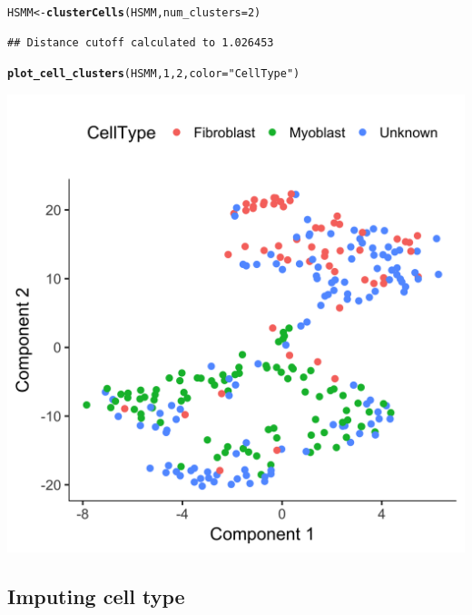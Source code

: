 \documentclass[10pt,oneside]{article}\usepackage[]{graphicx}\usepackage[]{color}
\makeatletter
\def\maxwidth{ %
  \ifdim\Gin@nat@width>\linewidth
    \linewidth
  \else
    \Gin@nat@width
  \fi
}
\newcommand{\hlnum}[1]{\textcolor[rgb]{0.686,0.059,0.569}{#1}}%
\newcommand{\hlstr}[1]{\textcolor[rgb]{0.192,0.494,0.8}{#1}}%
\newcommand{\hlstd}[1]{\textcolor[rgb]{0.345,0.345,0.345}{#1}}%
\newcommand{\hlkwb}[1]{\textcolor[rgb]{0.69,0.353,0.396}{#1}}%
\newcommand{\hlkwc}[1]{\textcolor[rgb]{0.333,0.667,0.333}{#1}}%
\newcommand{\hlkwd}[1]{\textcolor[rgb]{0.737,0.353,0.396}{\textbf{#1}}}%
\newenvironment{kframe}{%
 \def\at@end@of@kframe{}%
 \ifinner\ifhmode%
  \def\at@end@of@kframe{\end{minipage}}%
  \begin{minipage}{\columnwidth}%
 \fi\fi%
 \def\FrameCommand##1{\hskip\@totalleftmargin \hskip-\fboxsep
 \colorbox{shadecolor}{##1}\hskip-\fboxsep
     \hskip-\linewidth \hskip-\@totalleftmargin \hskip\columnwidth}%
 \MakeFramed {\advance\hsize-\width
   \@totalleftmargin\z@ \linewidth\hsize
   \@setminipage}}%
 {\par\unskip\endMakeFramed%
 \at@end@of@kframe}
\newenvironment{knitrout}{}{} %
\makeatother
\begin{document}
\begin{knitrout}
\begin{kframe}
{\ttfamily\noindent\itshape\color{messagecolor}{\#\# Remove noise by PCA ...}}

{\ttfamily\noindent\itshape\color{messagecolor}{\#\# Reduce dimension by tSNE ...}}\begin{alltt}
\hlstd{HSMM} \hlkwb{<-} \hlkwd{clusterCells}\hlstd{(HSMM,} \hlkwc{num_clusters}\hlstd{=}\hlnum{2}\hlstd{)}
\end{alltt}
\begin{verbatim}
## Distance cutoff calculated to 1.026453
\end{verbatim}


{\ttfamily\noindent\itshape\color{messagecolor}{\#\# the length of the distance: 34191}}\begin{alltt}
\hlkwd{plot_cell_clusters}\hlstd{(HSMM,} \hlnum{1}\hlstd{,} \hlnum{2}\hlstd{,} \hlkwc{color}\hlstd{=}\hlstr{"CellType"}\hlstd{)}
\end{alltt}
\end{kframe}

{\centering \includegraphics[width=\maxwidth]{figure/cluster_cells_semisup_clustering_no_impute-2} 

}



\end{knitrout}
 
 \subsection{Imputing cell type}
 
\end{document}
